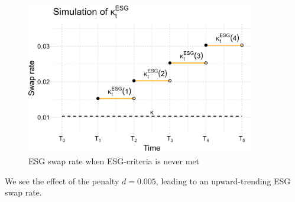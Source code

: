 \begin{figure}[htp]
    \centering
    \includegraphics[width=10cm]{figures/ESG/kappa_t_ESG_3.png}
    \caption{ESG swap rate when ESG-criteria is never met}
    \label{fig: ESG_swap_3}
\end{figure} 

We see the effect of the penalty $d = 0.005$, leading to an upward-trending ESG swap rate. 









